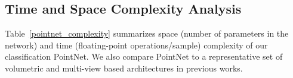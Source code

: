 \subsection{Time and Space Complexity Analysis}
\label{sec:complexity}
Table~\ref{pointnet_complexity} summarizes space (number of parameters in the network) and time (floating-point operations/sample) complexity of our classification PointNet. We also compare PointNet to a representative set of volumetric and multi-view based architectures in previous works.

